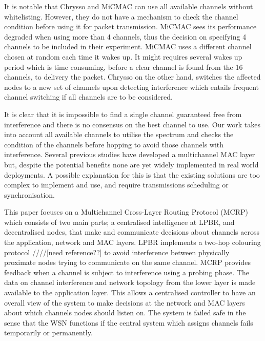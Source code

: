 It is notable that Chrysso and MiCMAC can use all available channels without whitelisting. However, they do not have a mechanism to check the channel condition before using it for packet transmission. MiCMAC sees its performance degraded when using more than 4 channels, thus the decision on specifying 4 channels to be included in their experiment. 
MiCMAC uses a different channel chosen at random each time it wakes up.
It might requires several wakes up period which is time consuming, before a clear channel is found from the 16 channels, to delivery the packet. 
Chrysso on the other hand, switches the affected nodes to a new set of channels upon detecting interference which entails frequent channel switching if all channels are to be considered.

It is clear that it is impossible to find a single channel guaranteed free from interference and there is no consensus on the best channel to use. Our work takes into account all available channels to utilise the spectrum and checks the condition of the channels before hopping to avoid those channels with interference. Several previous studies have developed a multichannel MAC layer but, despite the potential benefits none are yet widely implemented in real world deployments. 
A possible explanation for this is that the existing solutions are too complex to implement and use, and require transmissions scheduling or synchronisation. 

This paper focuses on a Multichannel Cross-Layer Routing Protocol (MCRP) which consists of two main parts; a centralised intelligence at LPBR, and decentralised nodes, that make and communicate decisions about channels across the application, network and MAC layers. LPBR implements a two-hop colouring protocol ////[need reference??] to avoid interference between physically proximate nodes trying to communicate on the same channel. MCRP provides feedback when a channel is subject to interference using a probing phase. The data on channel interference and network topology from the lower layer is made available to the application layer. This allows a centralised controller to have an overall view of the system to make decisions at the network and MAC layers about which channels nodes should listen on. The system is failed safe in the sense that the WSN functions if the central system which assigns channels fails temporarily or permanently.


